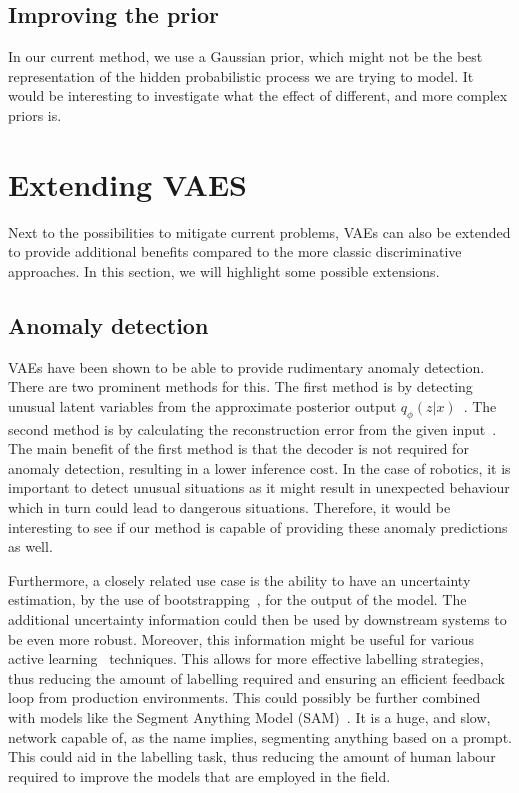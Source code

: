 \subsection{Improving the prior}
In our current method, we use a Gaussian prior, which might not be the best representation of the hidden probabilistic process we are trying to model. It would be interesting to investigate what the effect of different, and more complex priors is.

\section{Extending VAES}
Next to the possibilities to mitigate current problems, VAEs can also be extended to provide additional benefits compared to the more classic discriminative approaches. In this section, we will highlight some possible extensions.

\subsection{Anomaly detection}
VAEs have been shown to be able to provide rudimentary anomaly detection. There are two prominent methods for this. The first method is by detecting unusual latent variables from the approximate posterior output $q_{\phi}(z|x)$~\cite{marimont2020anomalydetectionlatentspace,angiulli2020improving,angiulli2023latent}. The second method is by calculating the reconstruction error from the given input~\cite{an2015variational, zhou2020unsupervisedanomalylocalizationusing, gouda2022unsupervised}. The main benefit of the first method is that the decoder is not required for anomaly detection, resulting in a lower inference cost. In the case of robotics, it is important to detect unusual situations as it might result in unexpected behaviour which in turn could lead to dangerous situations. Therefore, it would be interesting to see if our method is capable of providing these anomaly predictions as well.

Furthermore, a closely related use case is the ability to have an uncertainty estimation, by the use of bootstrapping~\cite{chen2018use,kohl2018probabilistic}, for the output of the model. The additional uncertainty information could then be used by downstream systems to be even more robust. Moreover, this information might be useful for various active learning~\cite{hino2020active} techniques. This allows for more effective labelling strategies, thus reducing the amount of labelling required and ensuring an efficient feedback loop from production environments. This could possibly be further combined with models like the Segment Anything Model (SAM)~\cite{kirillov2023segment}. It is a huge, and slow, network capable of, as the name implies, segmenting anything based on a prompt. This could aid in the labelling task, thus reducing the amount of human labour required to improve the models that are employed in the field.


